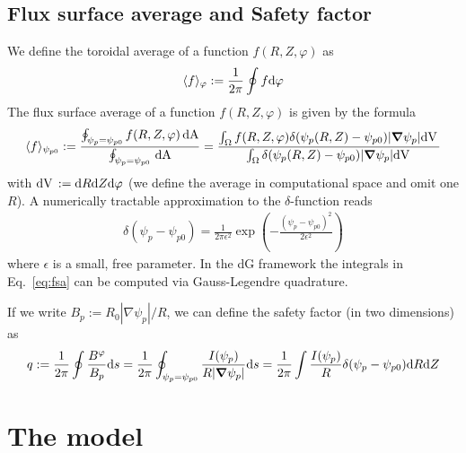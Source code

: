 \subsection{Flux surface average and Safety factor}
We define the toroidal average of a function $f(R,Z,\varphi)$ as
\begin{align} \label{eq:phi_average}
\langle f\rangle_\varphi := \frac{1}{2\pi}\oint f\mathrm{d} \varphi
\end{align}
The flux surface average
of a function $f(R,Z,\varphi)$ is given by the formula
\begin{align}\label{eq:fsa}
\langle f \rangle_{\psi_{p0}} :=
\frac{ \oint_{\psi_p = \psi_{p0} } f(R,Z,\varphi)\,\mathrm{dA}}{\oint_{\psi_p = \psi_{p0} } \,\mathrm{dA}} =
\frac{\int_\Omega f(R,Z,\varphi) \delta(\psi_p(R,Z)-\psi_{p0})|{\boldsymbol{\nabla}}\psi_p| \mathrm{dV}\,}
{\int_\Omega \delta(\psi_p(R,Z)-\psi_{p0})|{\boldsymbol{\nabla}}\psi_p|\mathrm{dV}\,}
\end{align}
with $\mathrm{dV}\, := \mathrm{d} R\mathrm{d} Z\mathrm{d} \varphi$ (we define the average in computational space and omit one $R$).
A numerically tractable approximation to the $\delta$-function reads
\begin{align}\label{eq:delta}
\delta(\psi_p-\psi_{p0}) = \frac{1}{2\pi \epsilon^2}
\exp\left( - \frac{\left(\psi_p-\psi_{p0}\right)^2}{2\epsilon^2}\right)
\end{align}
where $\epsilon$ is a small, free parameter. In the dG framework the integrals
in Eq.~\eqref{eq:fsa} can be computed via Gauss-Legendre quadrature.

If we write $B_p:=R_0|\nabla\psi_p|/R$, we can define the safety factor (in two dimensions) as
\begin{align}
q:=\frac{1}{2\pi}\oint \frac{B^\varphi}{B_p} \mathrm{d} s = \frac{1}{2\pi}\oint_{\psi_p=\psi_{p0}}\frac{I(\psi_p)}{R|{\boldsymbol{\nabla}}\psi_p|} \mathrm{d} s
= \frac{1}{2\pi}\int \frac{I(\psi_p)}{R}\delta(\psi_p-\psi_{p0}) \mathrm{d} R\mathrm{d} Z
\end{align}


\section{The model} \label{sec:model}
